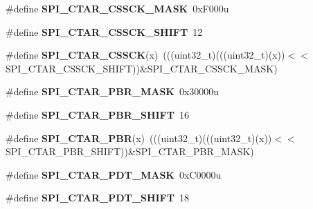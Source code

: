 \begin{DoxyCompactItemize}
\item 
\#define {\bfseries S\+P\+I\+\_\+\+C\+T\+A\+R\+\_\+\+C\+S\+S\+C\+K\+\_\+\+M\+A\+SK}~0x\+F000u\hypertarget{group__SPI__Register__Masks_ga5c824276fa48ae7b05fc922d20d237c0}{}\label{group__SPI__Register__Masks_ga5c824276fa48ae7b05fc922d20d237c0}

\item 
\#define {\bfseries S\+P\+I\+\_\+\+C\+T\+A\+R\+\_\+\+C\+S\+S\+C\+K\+\_\+\+S\+H\+I\+FT}~12\hypertarget{group__SPI__Register__Masks_gaf4e35373d2e9149e1c73f9b65887ad37}{}\label{group__SPI__Register__Masks_gaf4e35373d2e9149e1c73f9b65887ad37}

\item 
\#define {\bfseries S\+P\+I\+\_\+\+C\+T\+A\+R\+\_\+\+C\+S\+S\+CK}(x)~(((uint32\+\_\+t)(((uint32\+\_\+t)(x))$<$$<$S\+P\+I\+\_\+\+C\+T\+A\+R\+\_\+\+C\+S\+S\+C\+K\+\_\+\+S\+H\+I\+FT))\&S\+P\+I\+\_\+\+C\+T\+A\+R\+\_\+\+C\+S\+S\+C\+K\+\_\+\+M\+A\+SK)\hypertarget{group__SPI__Register__Masks_ga3c988f51f8a9ffc42af2b1c780796666}{}\label{group__SPI__Register__Masks_ga3c988f51f8a9ffc42af2b1c780796666}

\item 
\#define {\bfseries S\+P\+I\+\_\+\+C\+T\+A\+R\+\_\+\+P\+B\+R\+\_\+\+M\+A\+SK}~0x30000u\hypertarget{group__SPI__Register__Masks_ga4f40ea2ab0d14559523ab0699fd682c6}{}\label{group__SPI__Register__Masks_ga4f40ea2ab0d14559523ab0699fd682c6}

\item 
\#define {\bfseries S\+P\+I\+\_\+\+C\+T\+A\+R\+\_\+\+P\+B\+R\+\_\+\+S\+H\+I\+FT}~16\hypertarget{group__SPI__Register__Masks_gaf53f764d59da1c7a68c9185a71dfec66}{}\label{group__SPI__Register__Masks_gaf53f764d59da1c7a68c9185a71dfec66}

\item 
\#define {\bfseries S\+P\+I\+\_\+\+C\+T\+A\+R\+\_\+\+P\+BR}(x)~(((uint32\+\_\+t)(((uint32\+\_\+t)(x))$<$$<$S\+P\+I\+\_\+\+C\+T\+A\+R\+\_\+\+P\+B\+R\+\_\+\+S\+H\+I\+FT))\&S\+P\+I\+\_\+\+C\+T\+A\+R\+\_\+\+P\+B\+R\+\_\+\+M\+A\+SK)\hypertarget{group__SPI__Register__Masks_ga32e4047abbaf3dcf3d1cb2ab30142442}{}\label{group__SPI__Register__Masks_ga32e4047abbaf3dcf3d1cb2ab30142442}

\item 
\#define {\bfseries S\+P\+I\+\_\+\+C\+T\+A\+R\+\_\+\+P\+D\+T\+\_\+\+M\+A\+SK}~0x\+C0000u\hypertarget{group__SPI__Register__Masks_ga3680f8dc0308705f06e234914edfa14b}{}\label{group__SPI__Register__Masks_ga3680f8dc0308705f06e234914edfa14b}

\item 
\#define {\bfseries S\+P\+I\+\_\+\+C\+T\+A\+R\+\_\+\+P\+D\+T\+\_\+\+S\+H\+I\+FT}~18\hypertarget{group__SPI__Register__Masks_ga4201dd4e39a23f36fc01eb3f74b7c094}{}\label{group__SPI__Register__Masks_ga4201dd4e39a23f36fc01eb3f74b7c094}


\end{DoxyCompactItemize}
